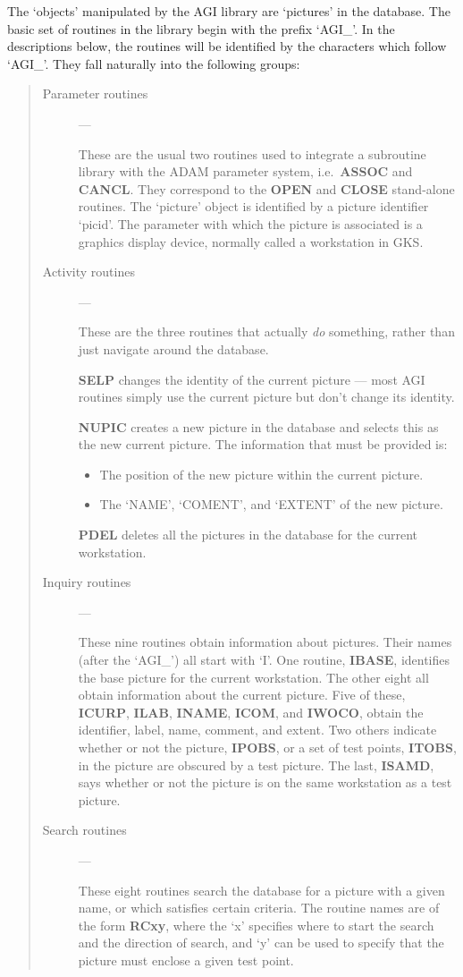 The `objects' manipulated by the AGI library are `pictures' in the database.
The basic set of routines in the library begin with the prefix `AGI\_'.
In the descriptions below, the routines will be identified by the characters
which follow `AGI\_'.
They fall naturally into the following groups:
\begin{quote}
\begin{description}

\item [Parameter routines] ---

These are the usual two routines used to integrate a subroutine library with
the ADAM parameter system, i.e.\ {\bf ASSOC} and {\bf CANCL}.
They correspond to the {\bf OPEN} and {\bf CLOSE} stand-alone routines.
The `picture' object is identified by a picture identifier `picid'.
The parameter with which the picture is associated is a graphics display
device,
normally called a workstation in GKS.

\item [Activity routines] ---

These are the three routines that actually {\em do} something, rather than just
navigate around the database.

{\bf SELP} changes the identity of the current picture --- most AGI routines
 simply use the current picture but don't change its identity.

{\bf NUPIC} creates a new picture in the database and selects this as the
new current picture.
The information that must be provided is:
\begin{itemize}
\item The position of the new picture within the current picture.
\item The `NAME', `COMENT', and `EXTENT' of the new picture.
\end{itemize}
{\bf PDEL} deletes all the pictures in the database for the current workstation.

\item [Inquiry routines] ---

These nine routines obtain information about pictures.
Their names (after the `AGI\_') all start with `I'.
One routine, {\bf IBASE}, identifies the base picture for the current
workstation.
The other eight all obtain information about the current picture.
Five of these, {\bf ICURP}, {\bf ILAB}, {\bf INAME}, {\bf ICOM}, and
{\bf IWOCO}, obtain the identifier, label, name, comment, and extent.
Two others indicate whether or not the picture, {\bf IPOBS}, or a set of
test points, {\bf ITOBS}, in the picture are obscured by a test picture.
The last, {\bf ISAMD}, says whether or not the picture is on the same
workstation as a test picture.

\item [Search routines] ---

These eight routines search the database for a picture with a given name, or
which satisfies certain criteria.
The routine names are of the form {\bf RCxy}, where the `x' specifies where to
start the search and the direction of search, and  `y' can be used to specify
that the picture must enclose a given test point.
\end{description}
\end{quote}

